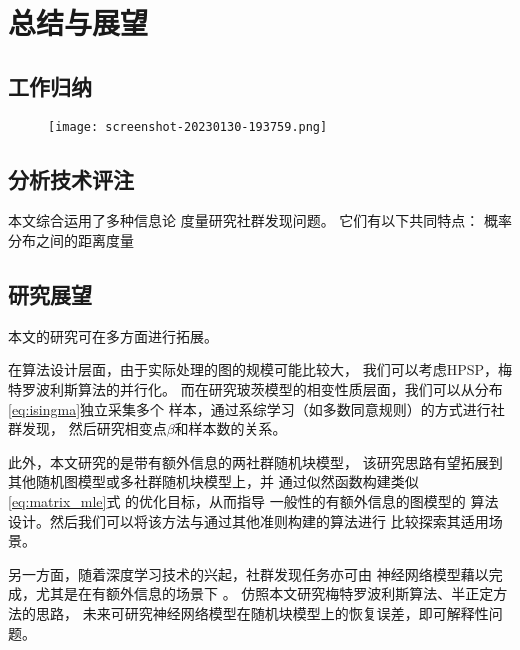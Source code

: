 \chapter{总结与展望}
\section{工作归纳}

\begin{figure}[!ht]
    \texttt{[image: screenshot-20230130-193759.png]}
\end{figure}

\section{分析技术评注}
本文综合运用了多种信息论
度量研究社群发现问题。
它们有以下共同特点：
概率分布之间的距离度量
\section{研究展望}
本文的研究可在多方面进行拓展。

在算法设计层面，由于实际处理的图的规模可能比较大，
我们可以考虑HPSP，梅特罗波利斯算法的并行化。
而在研究玻茨模型的相变性质层面，我们可以从分布
\eqref{eq:isingma}独立采集多个
样本，通过系综学习（如多数同意规则）的方式进行社群发现，
然后研究相变点$\beta$和样本数的关系。

此外，本文研究的是带有额外信息的两社群随机块模型，
该研究思路有望拓展到其他随机图模型或多社群随机块模型上，并
通过似然函数构建类似\eqref{eq:matrix_mle}式
的优化目标，从而指导
一般性的有额外信息的图模型的
算法设计。然后我们可以将该方法与通过其他准则\cite{chunaev2020community}构建的算法进行
比较探索其适用场景。

另一方面，随着深度学习技术的兴起，社群发现任务亦可由
神经网络模型藉以完成，尤其是在有额外信息的场景下 \cite{cao2018incorporating}。
仿照本文研究梅特罗波利斯算法、半正定方法的思路，
未来可研究神经网络模型在随机块模型上的恢复误差，即可解释性问题。